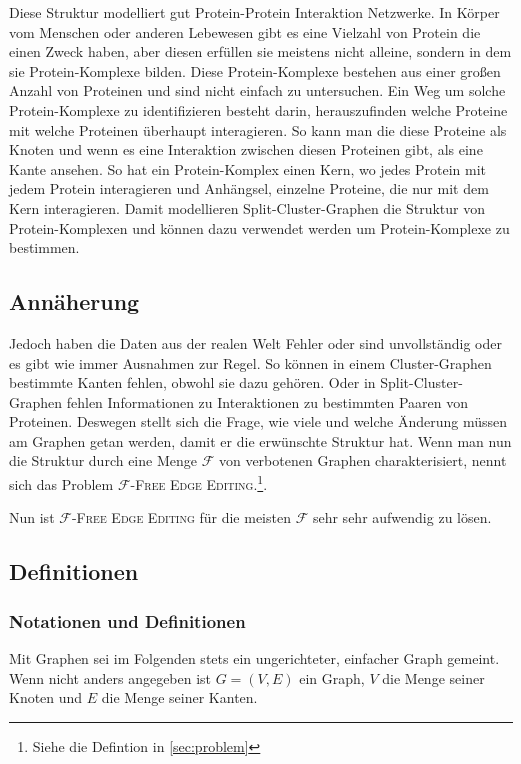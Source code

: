 \documentclass[12pt,a4paper,onecolumn,oneside,titlepage]{article}
\newcommand\cursive[1]{\ensuremath{\mathcal{#1}}}
\begin{document}
Diese Struktur modelliert gut Protein-Protein Interaktion Netzwerke. In Körper vom Menschen oder anderen Lebewesen gibt es eine Vielzahl von Protein die einen Zweck haben, aber diesen erfüllen sie meistens nicht alleine, sondern in dem sie Protein-Komplexe bilden. Diese Protein-Komplexe bestehen aus einer großen Anzahl von Proteinen und sind nicht einfach zu untersuchen. Ein Weg um solche Protein-Komplexe zu identifizieren besteht darin, herauszufinden welche Proteine mit welche Proteinen überhaupt interagieren. So kann man die diese Proteine als Knoten und wenn es eine Interaktion zwischen diesen Proteinen gibt, als eine Kante ansehen. So hat ein Protein-Komplex einen Kern, wo jedes Protein mit jedem Protein interagieren und Anhängsel, einzelne Proteine, die nur mit dem Kern interagieren. Damit modellieren Split-Cluster-Graphen die Struktur von Protein-Komplexen und können dazu verwendet werden um Protein-Komplexe zu bestimmen.

\subsection{Annäherung}
Jedoch haben die Daten aus der realen Welt Fehler oder sind unvollständig oder es gibt wie immer Ausnahmen zur Regel. So können in einem Cluster-Graphen bestimmte Kanten fehlen, obwohl sie dazu gehören. Oder in Split-Cluster-Graphen fehlen Informationen zu Interaktionen zu bestimmten Paaren von Proteinen. Deswegen stellt sich die Frage, wie viele und welche Änderung müssen am Graphen getan werden, damit er die erwünschte Struktur hat. Wenn man nun die Struktur durch eine Menge \cursive{F} von verbotenen Graphen charakterisiert, nennt sich das Problem \textsc{\cursive{F}-Free Edge Editing}.\footnote{Siehe die Defintion in \ref{sec:problem}}. 

Nun ist \textsc{\cursive{F}-Free Edge Editing} für die meisten \cursive{F} sehr sehr aufwendig zu lösen. 


\subsection{Definitionen}
\subsubsection{Notationen und Definitionen}
\label{sec:notation}
Mit Graphen sei im Folgenden stets ein ungerichteter, einfacher Graph gemeint. Wenn nicht anders angegeben ist $G=(V,E)$ ein Graph, $V$ die Menge seiner Knoten und $E$ die Menge seiner Kanten.
\end{document}
